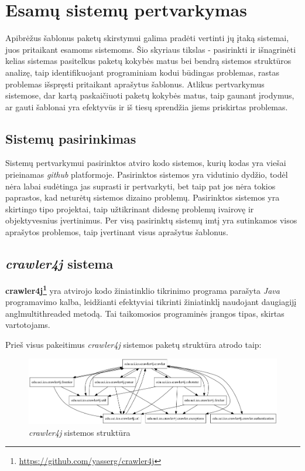 \section{Esamų sistemų pertvarkymas}
Apibrėžus šablonus paketų skirstymui galima pradėti vertinti jų įtaką sistemai, juos pritaikant esamoms sistemoms.
Šio skyriaus tikslas - pasirinkti ir išnagrinėti kelias sistemas pasitelkus paketų kokybės matus bei bendrą sistemos struktūros analizę,
taip identifikuojant programiniam kodui būdingas problemas, rastas problemas išspręsti pritaikant aprašytus šablonus.
Atlikus pertvarkymus sistemose, dar kartą paskaičiuoti paketų kokybės matus,
taip gaunant įrodymus, ar gauti šablonai yra efektyvūs ir iš tiesų sprendžia
jiems priskirtas problemas.


\subsection{Sistemų pasirinkimas}
Sistemų pertvarkymui pasirinktos atviro kodo sistemos, kurių kodas yra viešai prieinamas \textit{github} platformoje.
Pasirinktos sistemos yra vidutinio dydžio, todėl nėra labai sudėtinga jas suprasti ir pertvarkyti, bet taip pat jos nėra
tokios paprastos, kad neturėtų sistemos dizaino problemų.
Pasirinktos sistemos yra skirtingo tipo projektai, taip užtikrinant didesnę problemų ivairovę ir objektyvesnius įvertinimus.
Per visą pasirinktų sistemų imtį yra sutinkamos visos aprašytos problemos, taip įvertinant visus aprašytus šablonus.

\subsection{\textit{crawler4j} sistema}
\textbf{crawler4j\footnote{\url{https://github.com/yasserg/crawler4j}}} yra atvirojo kodo
žiniatinklio tikrinimo  programa parašyta \textit{Java} programavimo kalba, leidžianti
efektyviai tikrinti žiniatinklį naudojant daugiagijį angl{multithreaded} metodą.
Tai taikomosios programinės įrangos tipas, skirtas vartotojams.

Prieš visus pakeitimus \textit{crawler4j} sistemos paketų struktūra atrodo taip:
\begin{figure}[H]
    \centering
    \includegraphics[scale=0.5]{img/crawler_packages_orig}
    \caption{\textit{crawler4j} sistemos struktūra}
    \label{img:crawler_packages_orig}
\end{figure}

